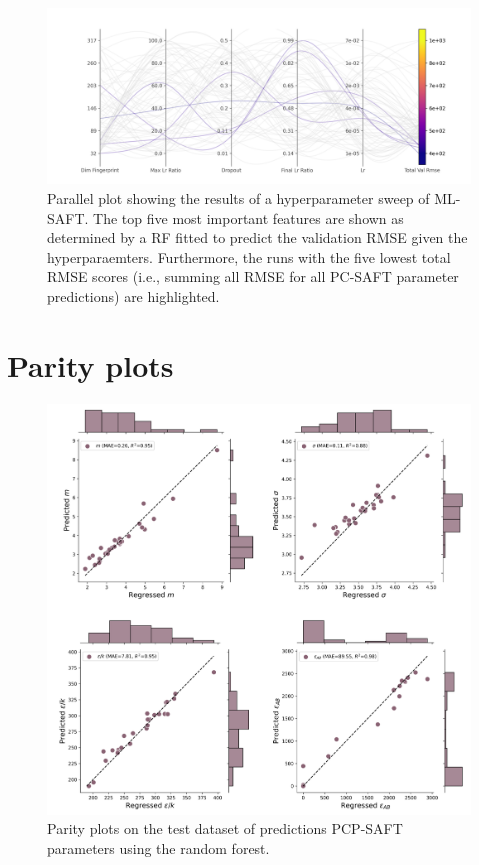 \begin{figure}
    \centering
    \includegraphics[width=\textwidth]{gfx/Chapter08/pyg_sweep_u157us_parallel_plot_total_val_rmse.png}
    \caption{Parallel plot showing the results of a hyperparameter sweep of ML-SAFT. The top five most important features are shown as determined by a RF fitted to predict the validation RMSE given the hyperparaemters. Furthermore, the runs with the five lowest total RMSE scores (i.e., summing all RMSE for all PC-SAFT parameter predictions) are highlighted.}
    \label{fig:ML-SAFT_sweep_parallel_plot}
\end{figure}

\section{Parity plots}\label{app:parity}

\begin{figure}
    \centering
    \includegraphics[width=\textwidth]{gfx/Chapter08/rf_parity_plots.png}
    \caption{Parity plots on the test dataset of predictions PCP-SAFT parameters using the random forest.}
    \label{fig:rf}
\end{figure}


